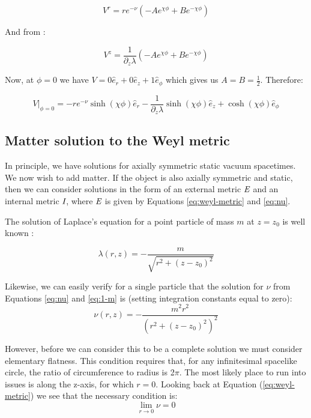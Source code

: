 \documentclass{article}
\begin{document}
\begin{equation}
V^{r}=re^{-\nu}\left(-Ae^{\chi\phi}+Be^{-\chi\phi}\right)
\end{equation}

And from :

\begin{equation}
V^{z}=\frac{1}{\partial_{z}\lambda}\left(-Ae^{\chi\phi}+Be^{-\chi\phi}\right)
\end{equation}

Now, at $\phi=0$ we have $V=0\hat{e}_{r}+0\hat{e}_{z}+1\hat{e}_{\phi}$ which gives us $A=B=\frac{1}{2}$. Therefore:

\begin{equation}
V|_{\phi=0}=-re^{-\nu}\sinh(\chi\phi)\hat{e}_{r}-\frac{1}{\partial_{z}\lambda}\sinh(\chi\phi)\hat{e}_{z}+\cosh(\chi\phi)\hat{e}_{\phi}
\end{equation}



\subsection{Matter solution to the Weyl metric}

In principle, we have solutions for axially symmetric static vacuum spacetimes. We now wish to add matter. If the object is also axially symmetric and static, then we can consider solutions in the form of an external metric $\emph{E}$ and an internal metric $\emph{I}$, where $\emph{E}$ is given by Equations \eqref{eq:weyl-metric} and \eqref{eq:nu}.

The solution of Laplace's equation for a point particle of mass $m$ at $z=z_{0}$ is well known \cite{letelier1997superposition}:

\begin{equation}
\lambda (r,z)=-\frac{m}{\sqrt{r^{2}+\left(z-z_{0}\right)^{2}}}\label{eq:1-m}
\end{equation}

Likewise, we can easily verify for a single particle that the solution for $\nu$ from Equations \eqref{eq:nu} and \eqref{eq:1-m} is (setting integration constants equal to zero):
\begin{equation}
\nu (r,z)=-\frac{m^{2}r^{2}}{\left(r^{2}+\left(z-z_{0}\right)^{2}\right)^{2}}
\end{equation}

However, before we can consider this to be a complete solution we must consider elementary flatness. This condition requires that, for any infinitesimal spacelike circle, the ratio of circumference to radius is 2$\pi$. The most likely place to run into issues is along the z-axis, for which $r=0$. Looking back at Equation (\ref{eq:weyl-metric}) we see that the necessary condition is:
\begin{equation}
\lim_{r\rightarrow 0}\nu=0\label{eq:elem-flat}
\end{equation}
\end{document}
